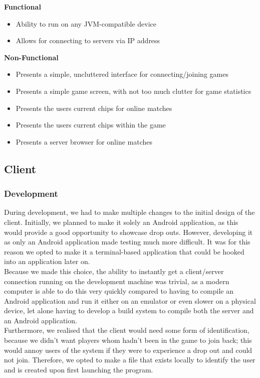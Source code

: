 \documentclass[11pt]{article}
\begin{document}
\textbf{Functional}
\begin{itemize}
	\item Ability to run on any JVM-compatible device
	\item Allows for connecting to servers via IP address
\end{itemize}

\textbf{Non-Functional}
\begin{itemize}
	\item Presents a simple, uncluttered interface for connecting/joining games
	\item Presents a simple game screen, with not too much clutter for game statistics
	\item Presents the users current chips for online matches
	\item Presents the users current chips within the game
	\item Presents a server browser for online matches
\end{itemize}

\newpage



\subsection{Client}
\subsubsection{Development}

During development, we had to make multiple changes to the initial design of the client. Initially, we planned to make it solely an Android application, as this would provide a good opportunity to showcase drop outs. However, developing it as only an Android application made testing much more difficult. It was for this reason we opted to make it a terminal-based application that could be hooked into an application later on. \\

Because we made this choice, the ability to instantly get a client/server connection running on the development machine was trivial, as a modern computer is able to do this very quickly compared to having to compile an Android application and run it either on an emulator or even slower on a physical device, let alone having to develop a build system to compile both the server and an Android application. \\

Furthermore, we realised that the client would need some form of identification, because we didn't want players whom hadn't been in the game to join back; this would annoy users of the system if they were to experience a drop out and could not join. Therefore, we opted to make a file that exists locally to identify the user and is created upon first launching the program. \\
\end{document}
